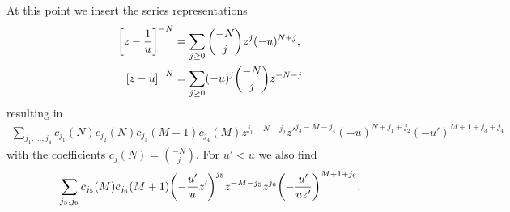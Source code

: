 \documentclass[english, parskip=full]{scrartcl}
\begin{document}
At this point we insert the series representations
\begin{align}
\klb*{z - \frac{1}{u}}^{-N} &= \sum_{j\ge 0} \binom{-N}{j} z^j (-u)^{N+j},\\
\klb*{z - u}^{-N} &= \sum_{j\ge 0} (-u)^j \binom{-N}{j} z^{-N-j}
\end{align}
resulting in
\begin{align}
\sum_{j_1,\dots,j_4} c_{j_1}(N) c_{j_2}(N) c_{j_3}(M+1) c_{j_4}(M) z^{j_1 -N-j_2} z'^{j_3 -M-j_4} (-u)^{N+j_1+j_2} (-u')^{M+1+j_3+j_4}
\end{align}
with the coefficients $c_j(N) = \binom{-N}{j}$.
For $u'<u$ we also find
\begin{align}
\sum_{j_5,j_6} c_{j_5}(M) c_{j_6}(M+1) \kla*{-\frac{u'}{u}z'}^{j_5} z^{-M-j_5} z^{j_6} \kla*{-\frac{u'}{uz'}}^{M+1+j_6}.
\end{align}
\end{document}
